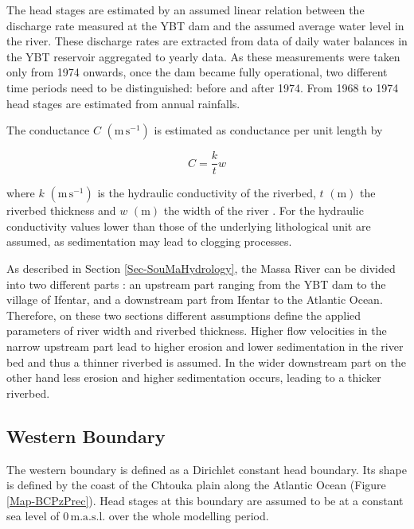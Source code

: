 The head stages are estimated by an assumed linear relation between the discharge rate measured at the YBT dam and the assumed average water level in the river. 
These discharge rates are extracted from data of daily water balances in the YBT reservoir aggregated to yearly data. 
As these measurements were taken only from 1974 onwards, once the dam became fully operational, two different time periods need to be distinguished: before and after 1974. 
From 1968 to 1974 head stages are estimated from annual rainfalls.

The conductance $C$ $\left( \textrm{m} \, \textrm{s}^{-1} \right)$ is estimated as conductance per unit length by

\begin{equation}
    C = \frac{k}{t} w
\end{equation}

where $k$ $\left( \textrm{m} \, \textrm{s}^{-1} \right)$ is the hydraulic conductivity of the riverbed, $t$ $\left( \textrm{m} \right)$ the riverbed thickness and $w$ $\left( \textrm{m}\right)$ the width of the river \parencite{Aquaveo.2019}. 
For the hydraulic conductivity values lower than those of the underlying lithological unit are assumed, as sedimentation may lead to clogging processes.

As described in Section \ref{Sec-SouMaHydrology}, the Massa River can be divided into two different parts \parencite{Horn.2021}: an upstream part ranging from the YBT dam to the village of Ifentar, and a downstream part from Ifentar to the Atlantic Ocean. 
Therefore, on these two sections different assumptions define the applied parameters of river width and riverbed thickness. 
Higher flow velocities in the narrow upstream part lead to higher erosion and lower sedimentation in the river bed and thus a thinner riverbed is assumed. 
In the wider downstream part on the other hand less erosion and higher sedimentation occurs, leading to a thicker riverbed.

\subsection{Western Boundary}

The western boundary is defined as a Dirichlet constant head boundary. 
Its shape is defined by the coast of the Chtouka plain along the Atlantic Ocean (Figure \ref{Map-BCPzPrec}). 
Head stages at this boundary are assumed to be at a constant sea level of $0 \, \textrm{m.a.s.l.}$ over the whole modelling period.

